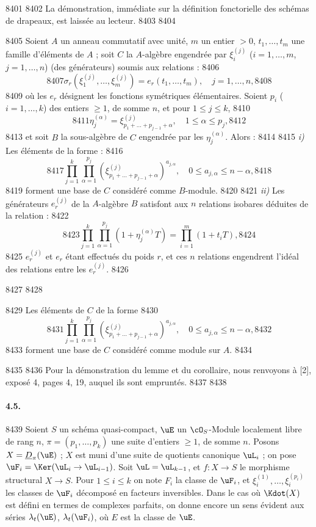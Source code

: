  8401	
  8402	La d\'emonstration, imm\'ediate sur la d\'efinition fonctorielle des sch\'emas de drapeaux, est laiss\'ee au lecteur.
  8403	
  8404	\begin{lemme}[4.3]
  8405	Soient $A$ un anneau commutatif avec unit\'e, $m$ un entier $> 0$, $t_1,\dots,t_m$ une famille d'\'el\'ements de $A$ ; soit $C$ la $A$-alg\`ebre engendr\'ee par $\xi_i^{(j)}$ ($i = 1,\dots,m$, $j = 1,\dots,n$) (des g\'en\'erateurs) soumis aux relations :
  8406	\[
  8407	\sigma_r(\xi_1^{(j)},\dots,\xi_m^{(j)}) = e_r(t_1,\dots,t_m), \quad j = 1,\dots,n,
  8408	\]
  8409	o\`u les $e_r$ d\'esignent les fonctions sym\'etriques \'el\'ementaires. Soient $p_i$ ($i = 1,\dots,k$) des entiers $\geq 1$, de somme $n$, et pour $1 \leq j \leq k$,
  8410	\[
  8411	\eta_j^{(\alpha)} = \xi_{p_1+\dots+p_{j-1}+\alpha}^{(j)}, \quad 1 \leq \alpha \leq p_j,
  8412	\]
  8413	et soit $B$ la sous-alg\`ebre de $C$ engendr\'ee par les $\eta_j^{(\alpha)}$. Alors :
  8414	
  8415	\emph{i)} Les \'el\'ements de la forme :
  8416	\[
  8417	\prod_{j=1}^{k} \prod_{\alpha=1}^{p_j} (\xi_{p_1+\dots+p_{j-1}+\alpha}^{(j)})^{a_{j,\alpha}}, \quad 0 \leq a_{j,\alpha} \leq n - \alpha,
  8418	\]
  8419	forment une base de $C$ consid\'er\'e comme $B$-module.
  8420	
  8421	\emph{ii)} Les g\'en\'erateurs $e_r^{(j)}$ de la $A$-alg\`ebre $B$ satisfont aux $n$ relations isobares d\'eduites de la relation :
  8422	\[
  8423	\prod_{j=1}^{k} \prod_{\alpha=1}^{p_j} (1 + \eta_j^{(\alpha)} T) = \prod_{i=1}^{m} (1 + t_i T),
  8424	\]
  8425	$e_r^{(j)}$ et $e_r$ \'etant effectu\'es du poids $r$, et ces $n$ relations engendrent l'id\'eal des relations entre les $e_r^{(j)}$.
  8426	\end{lemme}
  8427	
  8428	\begin{corollaire}[4.4]
  8429	Les \'el\'ements de $C$ de la forme
  8430	\[
  8431	\prod_{j=1}^{k} \prod_{\alpha=1}^{p_j} (\xi_{p_1+\dots+p_{j-1}+\alpha}^{(j)})^{a_{j,\alpha}}, \quad 0 \leq a_{j,\alpha} \leq n - \alpha,
  8432	\]
  8433	forment une base de $C$ consid\'er\'e comme module sur $A$.
  8434	\end{corollaire}
  8435	
  8436	Pour la d\'emonstration du lemme et du corollaire, nous renvoyons \`a [2], expos\'e 4, pages 4, 19, auquel ils sont emprunt\'es.
  8437	
  8438	\paragraph{4.5.}
  8439	Soient $S$ un sch\'ema quasi-compact, $\uE$ un $\cO_S$-Module localement libre de rang $n$, $\pi = (p_1,\dots,p_k)$ une suite d'entiers $\geq 1$, de somme $n$. Posons $X = \underline{D}_{\pi}(\uE)$ ; $X$ est muni d'une suite de quotients canonique $\uL_i$ ; on pose $\uF_i = \Ker(\uL_i \to \uL_{i-1})$. Soit $\uL = \uL_{k-1}$, et $f: X \to S$ le morphisme structural $X \to S$. Pour $1 \leq i \leq k$ on note $F_i$ la classe de $\uF_i$, et $\xi_i^{(1)},\dots,\xi_i^{(p_i)}$ les classes de $\uF_i$ d\'ecompos\'e en facteurs inversibles. Dans le cas o\`u $\Kdot(X)$ est d\'efini en termes de complexes parfaits, on donne encore un sens \'evident aux s\'eries $\lambda_t(\uE)$, $\lambda_t(\uF_i)$, o\`u $E$ est la classe de $\uE$.
